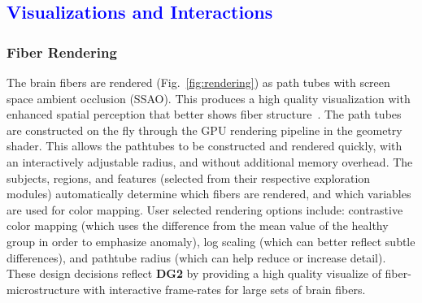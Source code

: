 \subsection{\textcolor{blue}{Visualizations and Interactions}}
\subsubsection{Fiber Rendering}
\label{sec:rendering}

\noindent The brain fibers are rendered (Fig.~\ref{fig:rendering}) as path tubes with screen space ambient occlusion (SSAO). This produces a high quality visualization with enhanced spatial perception that better shows fiber structure~\cite{mittring2007finding, eichelbaum2013lineao}. The path tubes are constructed on the fly through the GPU rendering pipeline in the geometry shader. This allows the pathtubes to be constructed and rendered quickly, with an interactively adjustable radius, and without additional memory overhead. The subjects, regions, and features (selected from their respective exploration modules) automatically determine which fibers are rendered, and which variables are used for color mapping.  User selected rendering options include: contrastive color mapping (which uses the difference from the mean value of the healthy group in order to emphasize anomaly), log scaling (which can better reflect subtle differences), and pathtube radius (which can help reduce or increase detail). These design decisions reflect \textbf{DG2} by providing a high quality visualize of fiber-microstructure with interactive frame-rates for large sets of brain fibers. 

